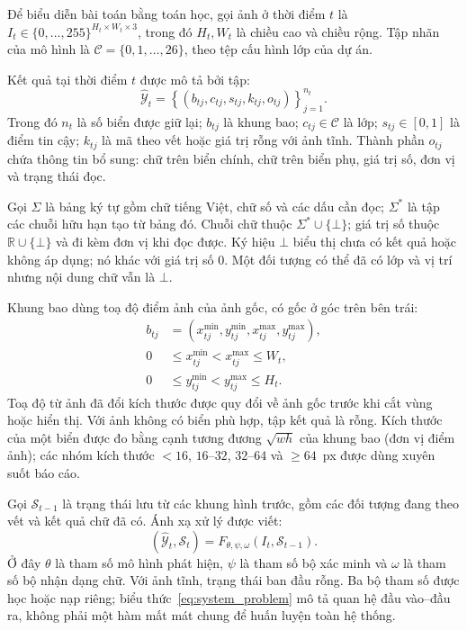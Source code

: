Để biểu diễn bài toán bằng toán học, gọi ảnh ở thời điểm $t$ là $I_t\in\{0,\ldots,255\}^{H_t\times W_t\times3}$, trong đó $H_t,W_t$ là chiều cao và chiều rộng. Tập nhãn của mô hình là $\mathcal{C}=\{0,1,\ldots,26\}$, theo tệp cấu hình lớp của dự án.

Kết quả tại thời điểm $t$ được mô tả bởi tập:
\begin{equation}
 \widehat{\mathcal{Y}}_t=
 \left\{(b_{tj},c_{tj},s_{tj},k_{tj},o_{tj})\right\}_{j=1}^{n_t}.
 \label{eq:output_problem}
\end{equation}
Trong đó $n_t$ là số biển được giữ lại; $b_{tj}$ là khung bao; $c_{tj}\in\mathcal{C}$ là lớp; $s_{tj}\in[0,1]$ là điểm tin cậy; $k_{tj}$ là mã theo vết hoặc giá trị rỗng với ảnh tĩnh. Thành phần $o_{tj}$ chứa thông tin bổ sung: chữ trên biển chính, chữ trên biển phụ, giá trị số, đơn vị và trạng thái đọc.

Gọi $\Sigma$ là bảng ký tự gồm chữ tiếng Việt, chữ số và các dấu cần đọc; $\Sigma^*$ là tập các chuỗi hữu hạn tạo từ bảng đó. Chuỗi chữ thuộc $\Sigma^*\cup\{\bot\}$; giá trị số thuộc $\mathbb{R}\cup\{\bot\}$ và đi kèm đơn vị khi đọc được. Ký hiệu $\bot$ biểu thị chưa có kết quả hoặc không áp dụng; nó khác với giá trị số 0. Một đối tượng có thể đã có lớp và vị trí nhưng nội dung chữ vẫn là $\bot$.

Khung bao dùng toạ độ điểm ảnh của ảnh gốc, có gốc ở góc trên bên trái:
\begin{equation}
 \begin{aligned}
 b_{tj}&=(x_{tj}^{\min},y_{tj}^{\min},x_{tj}^{\max},y_{tj}^{\max}),\\
 0&\le x_{tj}^{\min}<x_{tj}^{\max}\le W_t,\\
 0&\le y_{tj}^{\min}<y_{tj}^{\max}\le H_t.
 \end{aligned}
 \label{eq:box_problem}
\end{equation}
Toạ độ từ ảnh đã đổi kích thước được quy đổi về ảnh gốc trước khi cắt vùng hoặc hiển thị. Với ảnh không có biển phù hợp, tập kết quả là rỗng. Kích thước của một biển được đo bằng cạnh tương đương $\sqrt{wh}$ của khung bao (đơn vị điểm ảnh); các nhóm kích thước $<16$, $16$--$32$, $32$--$64$ và $\ge64$~px được dùng xuyên suốt báo cáo.

Gọi $\mathcal{S}_{t-1}$ là trạng thái lưu từ các khung hình trước, gồm các đối tượng đang theo vết và kết quả chữ đã có. Ánh xạ xử lý được viết:
\begin{equation}
 (\widehat{\mathcal{Y}}_t,\mathcal{S}_t)
 =F_{\theta,\psi,\omega}(I_t,\mathcal{S}_{t-1}).
 \label{eq:system_problem}
\end{equation}
Ở đây $\theta$ là tham số mô hình phát hiện, $\psi$ là tham số bộ xác minh và $\omega$ là tham số bộ nhận dạng chữ. Với ảnh tĩnh, trạng thái ban đầu rỗng. Ba bộ tham số được học hoặc nạp riêng; biểu thức~\eqref{eq:system_problem} mô tả quan hệ đầu vào--đầu ra, không phải một hàm mất mát chung để huấn luyện toàn hệ thống.

